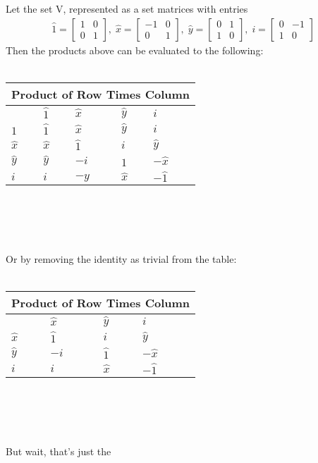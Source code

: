 \documentclass[12pt]{article}
\begin{document}
\pagebreak
Let the set V, represented as a set matrices with entries
\begin{gather*}
    \hat{1} = \begin{bmatrix} 1 & 0 \\ 0 & 1 \end{bmatrix},\;
    \hat{x} = \begin{bmatrix} -1 & 0 \\ 0 & 1 \end{bmatrix},\;
    \hat{y} = \begin{bmatrix} 0 & 1 \\ 1 & 0 \end{bmatrix},\;
    i = \begin{bmatrix} 0 & -1 \\ 1 & 0 \end{bmatrix}
\end{gather*}
Then the products above can be evaluated to the following: \\ \\
\begin{tabular}{|p{0.25cm}||p{2cm}|p{2cm}|p{2cm}|p{2cm}|}
    \hline \multicolumn{5}{|c|}{Product of Row Times Column} \\
    \hline & $\hat{1}$ & $\hat{x}$ & $\hat{y}$  & $i$\\
    \hline
        $\hat{1}$ & $\hat{1}$ & $\hat{x}$ & $\hat{y}$ & $i$ \\
        $\hat{x}$ & $\hat{x}$ & $\hat{1}$ & $i$ & $\hat{y}$ \\
        $\hat{y}$ & $\hat{y}$ & $-i$ & $\hat{1}$ & $-\hat{x}$ \\
        $i$ & $i$ & $-\hat{y}$ & $\hat{x}$ & $-\hat{1}$ \\
    \hline
\end{tabular} \\ \\ \\ \\
Or by removing the identity as trivial from the table: \\ \\
\begin{tabular}{|p{0.25cm}||p{2cm}|p{2cm}|p{2cm}|}
    \hline \multicolumn{4}{|c|}{Product of Row Times Column} \\
    \hline & $\hat{x}$ & $\hat{y}$  & $i$\\
    \hline
        $\hat{x}$ & $\hat{1}$ & $i$ & $\hat{y}$ \\
        $\hat{y}$ & $-i$ & $\hat{1}$ & $-\hat{x}$ \\
        $i$ & $i$ & $\hat{x}$ & $-\hat{1}$ \\
    \hline
\end{tabular} \\ \\  \\ \\
But wait, that's just the 
\end{document}
